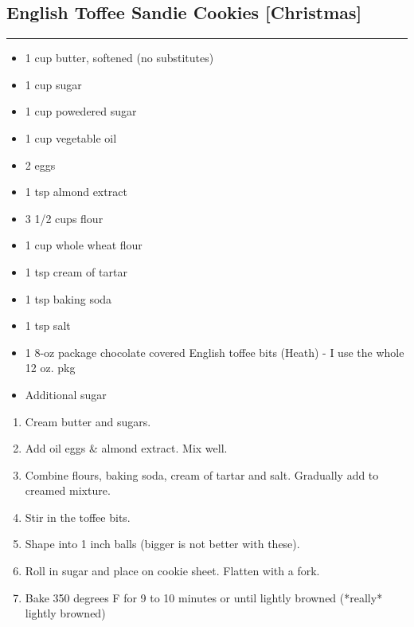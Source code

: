 \documentclass{article}
\begin{document}
\subsection{English Toffee Sandie Cookies [Christmas]} 
\noindent\rule[0.5ex]{\linewidth}{1pt}

\begin{framed}
    \begin{itemize}
        \item 1 cup butter, softened (no substitutes)
        \item 1 cup sugar
        \item 1 cup powedered sugar
        \item 1 cup vegetable oil
        \item 2 eggs 
        \item 1 tsp almond extract
        \item 3 1/2 cups flour
        \item 1 cup whole wheat flour
        \item 1 tsp cream of tartar
        \item 1 tsp baking soda
        \item 1 tsp salt
        \item 1 8-oz package chocolate covered English toffee bits (Heath) - I use the whole 12 oz. pkg
        \item Additional sugar
    \end{itemize}
\end{framed}

\begin{enumerate}
    \item 
        Cream butter and sugars. 
    \item 
        Add oil eggs \& almond extract. Mix well.
    \item 
        Combine flours, baking soda, cream of tartar and salt. Gradually add to creamed mixture. 
    \item 
        Stir in the toffee bits.
    \item 
        Shape into 1 inch balls (bigger is not better with these). 
    \item 
        Roll in sugar and place on cookie sheet. Flatten with a fork.
    \item 
        Bake 350 degrees F for 9 to 10 minutes or until lightly browned (*really* lightly browned)
\end{enumerate}
\newpage
\end{document}
